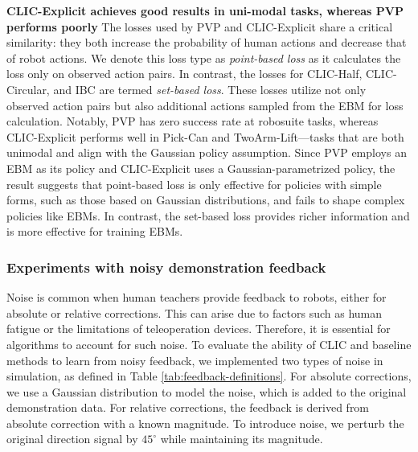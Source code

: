 
\textbf{CLIC-Explicit achieves good results in uni-modal tasks, whereas PVP performs poorly}
The losses used by PVP and CLIC-Explicit share a critical similarity: they both increase the probability of human actions and decrease that of robot actions.
We denote this loss type as \textit{point-based loss} as it calculates the loss only on observed action pairs. In contrast, the losses for CLIC-Half, CLIC-Circular, and IBC are termed \textit{set-based loss}.
These losses utilize not only observed action pairs but also additional actions sampled from the EBM for loss calculation. 
Notably, PVP has zero success rate at robosuite tasks, whereas CLIC-Explicit performs well in Pick-Can and TwoArm-Lift—tasks that are both unimodal and align with the Gaussian policy assumption. 
Since PVP employs an EBM as its policy and CLIC-Explicit uses a Gaussian-parametrized policy, 
the result suggests that point-based loss is only effective for policies with simple forms, such as those based on Gaussian distributions, and fails to shape complex policies like EBMs. 
In contrast, the set-based loss provides richer information and is more effective for training EBMs. 





\subsubsection{Experiments with noisy demonstration feedback}

Noise is common when human teachers provide feedback to robots, either for absolute or relative corrections.
This can arise due to factors such as human fatigue or the limitations of teleoperation devices. Therefore, it is essential for algorithms to account for such noise.
To evaluate the ability of CLIC and baseline methods to learn from noisy feedback, we implemented two types of noise in simulation, as defined in Table \ref{tab:feedback-definitions}. 
For absolute corrections, we use a Gaussian distribution to model the noise, which is added to the original demonstration data. 
For relative corrections, the feedback is derived from absolute correction with a known magnitude. To introduce noise, we perturb the original direction signal by $45^\circ$ while maintaining its magnitude.

